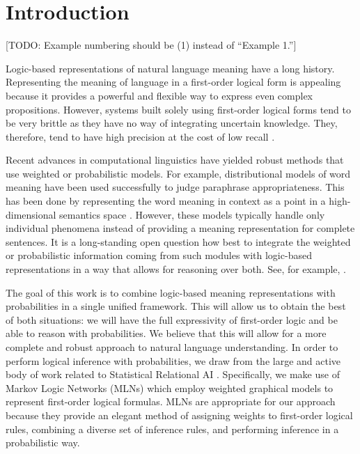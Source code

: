\section{Introduction}

[TODO: Example numbering should be (1) instead of ``Example 1.'']

Logic-based representations of natural language meaning have a long history.  
Representing the meaning of language in a first-order
logical form is appealing because it provides a powerful and flexible way to
express even complex propositions. 
However, systems built solely using first-order logical forms tend to be very
brittle as they have no way of integrating uncertain knowledge. 
They, therefore, tend to have high precision at the cost of low
recall \citep{bos:emnlp2005}.

Recent advances in computational linguistics have yielded robust methods that
use weighted or probabilistic models.  For example, distributional models of
word meaning have been used successfully to judge paraphrase appropriateness.
This has been done by representing the word meaning in context as a point in a
high-dimensional semantics space
\citep{erk:emnlp08,ThaterFuerstenauPinkal:10,erk:acl2010}. However, these
models typically handle only individual phenomena instead of providing a meaning
representation for complete sentences. It is a long-standing open question how
best to integrate the weighted or probabilistic information coming from such
modules with logic-based representations in a way that allows for reasoning over
both.  See, for example, \citet{hobbs:alj93}.

The goal of this work is to combine logic-based meaning representations
with probabilities in a single unified framework.  This will allow us to obtain
the best of both situations: we will have the full expressivity of 
first-order logic and be able to reason with probabilities.  We believe that
this will allow for a more complete and robust approach to natural language
understanding. In order to perform logical inference with probabilities, we draw 
from the large and active body of work related to Statistical Relational AI
\citep{getoor:book2007}.  Specifically, we make use of Markov Logic Networks
(MLNs) \citep{richardson:mlj06} which employ weighted graphical models to
represent first-order logical formulas. MLNs are appropriate for our approach
because they provide an elegant method of assigning weights to first-order
logical rules, combining a diverse set of inference rules, and performing
inference in a probabilistic way. 

